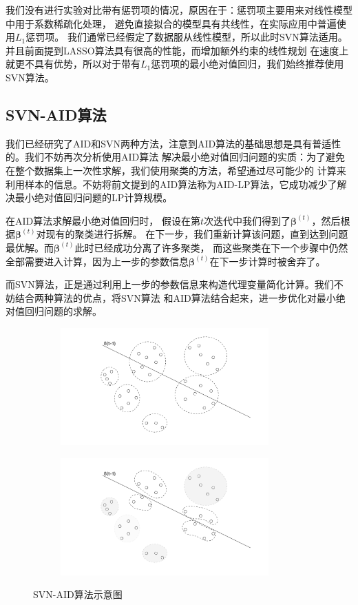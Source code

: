我们没有进行实验对比带有惩罚项的情况，原因在于：惩罚项主要用来对线性模型中用于系数稀疏化处理，
避免直接拟合的模型具有共线性，在实际应用中普遍使用$L_1$惩罚项。
我们通常已经假定了数据服从线性模型，所以此时SVN算法适用。并且前面提到LASSO算法具有很高的性能，而增加额外约束的线性规划
在速度上就更不具有优势，所以对于带有$L_1$惩罚项的最小绝对值回归，我们始终推荐使用SVN算法。


\subsection{SVN-AID算法}
我们已经研究了AID和SVN两种方法，注意到AID算法的基础思想是具有普适性的。我们不妨再次分析使用AID算法
解决最小绝对值回归问题的实质：为了避免在整个数据集上一次性求解，我们使用聚类的方法，希望通过尽可能少的
计算来利用样本的信息。不妨将前文提到的AID算法称为AID-LP算法，它成功减少了解决最小绝对值回归问题的LP计算规模。

在AID算法求解最小绝对值回归时，
假设在第$t$次迭代中我们得到了$\bm{\beta}^{(t)}$，然后根据$\bm{\beta}^{(t)}$对现有的聚类进行拆解。
在下一步，我们重新计算该问题，直到达到问题最优解。而$\bm{\beta}^{(t)}$此时已经成功分离了许多聚类，
而这些聚类在下一个步骤中仍然全部需要进入计算，因为上一步的参数信息$\bm{\beta}^{(t)}$在下一步计算时被舍弃了。

而SVN算法，正是通过利用上一步的参数信息来构造代理变量简化计算。我们不妨结合两种算法的优点，将SVN算法
和AID算法结合起来，进一步优化对最小绝对值回归问题的求解。

\begin{figure}[H]
    \centering
    \begin{subfigure}[t]{0.4\textwidth}\label{impro-demo1}
    \includegraphics[width=8cm]{pics/chapter2/impro-demo-1.pdf}
    \end{subfigure}
    \centering
    \begin{subfigure}[t]{0.4\textwidth}\label{impro-demo2}
    \includegraphics[width=8cm]{pics/chapter2/impro-demo-2.pdf}
    \end{subfigure}
    \caption{ \small SVN-AID算法示意图}
    \label{impro-demo}
\end{figure}

